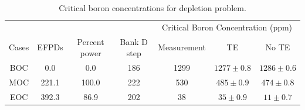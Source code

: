 \begin{table}
    \centering
    \caption{Critical boron concentrations for depletion problem.}
    \label{tab_425} 
    \begin{tabular}{| c | c | c | c | c | c | c | }
    \hline
          &       &               &              & \multicolumn{3}{|c|}{Critical Boron Concentration (ppm)}   \\
    \cline{5-7}
     Cases & EFPDs & Percent power & Bank D step & Measurement &   TE            & No TE             \\
     \hline
     BOC    & 0.0    & 0.0           & 186         & 1299        & $1277 \pm 0.8$  &  $1286 \pm 0.6$    \\ \hline
     MOC    & 221.1  & 100.0         & 222         & 530         & $485  \pm 0.9$  &  $474  \pm 0.8$    \\ \hline
     EOC    & 392.3  & 86.9          & 202         & 38          & $35   \pm 0.9$  &  $11   \pm 0.7$    \\ \hline
    \end{tabular}
\end{table}

